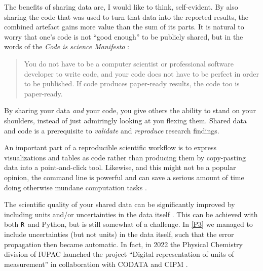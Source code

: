 \documentclass[draft,webedition,openright,titles,swedish,english]{LuaUUThesis}\usepackage[]{graphicx}\usepackage[]{xcolor}
\newcommand{\R}{\texttt{R}}
\begin{document}
The benefits of sharing data are, I would like to think, self-evident.
By also sharing the code that was used to turn that data into the reported results,
the combined artefact gains more value than the sum of its parts.
It is natural to worry that one's code is not \enquote{good enough} to be publicly shared,
but in the words of the \emph{Code is science Manifesto} \cite{Yehudi2019}:
\blockquote{%
   You do not have to be a computer scientist or professional software developer
   to write code, and your code does not have to be perfect in order to be published.
   If code produces paper-ready results, the code too is paper-ready.}
By sharing your data \emph{and} your code, you give others the ability
to stand on your shoulders, instead of just admiringly looking at you flexing them.
Shared data and code is a prerequisite to \emph{validate} and \emph{reproduce}
research findings.

An important part of a reproducible scientific workflow is to
express visualizations and tables as code rather than producing them by copy-pasting
data into a point-and-click tool.
Likewise, and this might not be a popular opinion, the command line is powerful
and can save a serious amount of time doing otherwise mundane computation tasks \cite{Perkel2021}.

The scientific quality of your shared data can be significantly improved by
including units and/or uncertainties in the data itself \cite{Hanisch2022}.
This can be achieved with both \R\ and Python, but is still somewhat of a challenge.
In \cref{P3} we managed to include uncertainties (but not units) in the data
itself, such that the error propagation then became automatic.
In fact, in 2022 the Physical Chemistry division of IUPAC launched the project
\enquote{Digital representation of units of measurement} in collaboration
with CODATA and CIPM \cite{Frey2020,CODATA2020}.
\end{document}
